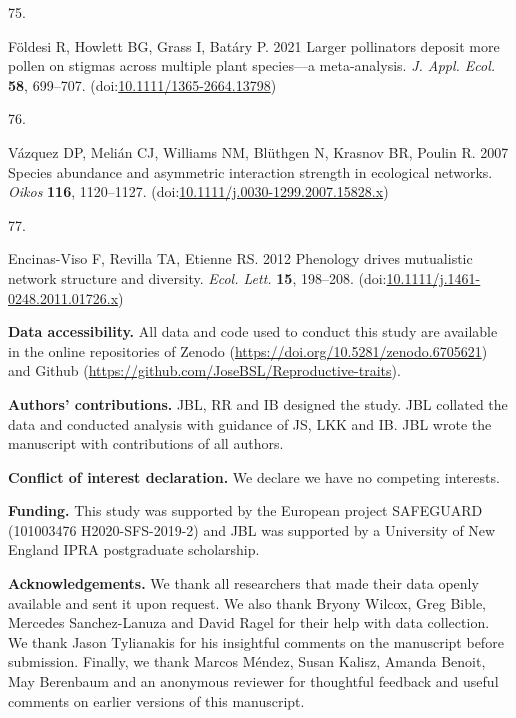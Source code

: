 \documentclass[
  12pt,
  a4paper,
]{article}
\newlength{\cslhangindent}
\newlength{\csllabelwidth}
\newlength{\cslentryspacingunit} %
\newenvironment{CSLReferences}[2] %
 {%
  \setlength{\parindent}{0pt}
  \ifodd #1
  \let\oldpar\par
  \def\par{\hangindent=\cslhangindent\oldpar}
  \fi
  \setlength{\parskip}{#2\cslentryspacingunit}
 }%
 {}
\newcommand{\CSLLeftMargin}[1]{\parbox[t]{\csllabelwidth}{#1}}
\newcommand{\CSLRightInline}[1]{\parbox[t]{\linewidth - \csllabelwidth}{#1}\break}
\begin{document}
\begin{CSLReferences}{0}{0}
\leavevmode{}%
\CSLLeftMargin{75. }
\CSLRightInline{Földesi R, Howlett BG, Grass I, Batáry P. 2021 Larger pollinators deposit more pollen on stigmas across multiple plant species---a meta-analysis. \emph{J. Appl. Ecol.} \textbf{58}, 699--707. (doi:\href{https://doi.org/10.1111/1365-2664.13798}{10.1111/1365-2664.13798})}

\leavevmode{}%
\CSLLeftMargin{76. }
\CSLRightInline{Vázquez DP, Melián CJ, Williams NM, Blüthgen N, Krasnov BR, Poulin R. 2007 Species abundance and asymmetric interaction strength in ecological networks. \emph{Oikos} \textbf{116}, 1120--1127. (doi:\href{https://doi.org/10.1111/j.0030-1299.2007.15828.x}{10.1111/j.0030-1299.2007.15828.x})}

\leavevmode{}%
\CSLLeftMargin{77. }
\CSLRightInline{Encinas-Viso F, Revilla TA, Etienne RS. 2012 Phenology drives mutualistic network structure and diversity. \emph{Ecol. Lett.} \textbf{15}, 198--208. (doi:\href{https://doi.org/10.1111/j.1461-0248.2011.01726.x}{10.1111/j.1461-0248.2011.01726.x})}

\end{CSLReferences}

\textbf{Data accessibility.} All data and code used to conduct this study are available in the online repositories of Zenodo (\url{https://doi.org/10.5281/zenodo.6705621}) and Github (\url{https://github.com/JoseBSL/Reproductive-traits}).

\textbf{Authors' contributions.} JBL, RR and IB designed the study. JBL collated the data and conducted analysis with guidance of JS, LKK and IB. JBL wrote the manuscript with contributions of all authors.

\textbf{Conflict of interest declaration.} We declare we have no competing interests.

\textbf{Funding.} This study was supported by the European project SAFEGUARD (101003476 H2020-SFS-2019-2) and JBL was supported by a University of New England IPRA postgraduate scholarship.

\textbf{Acknowledgements.} We thank all researchers that made their data openly available and sent it upon request. We also thank Bryony Wilcox, Greg Bible, Mercedes Sanchez-Lanuza and David Ragel for their help with data collection. We thank Jason Tylianakis for his insightful comments on the manuscript before submission. Finally, we thank Marcos Méndez, Susan Kalisz, Amanda Benoit, May Berenbaum and an anonymous reviewer for thoughtful feedback and useful comments on earlier versions of this manuscript.
\end{document}
